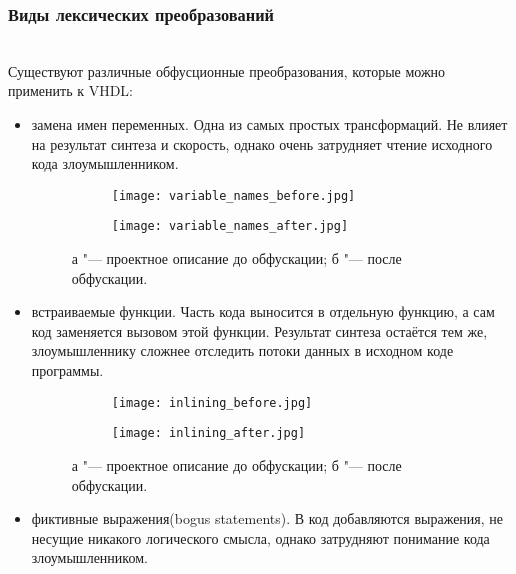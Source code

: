 \subsubsection{Виды лексических преобразований}~\\
Существуют различные обфусционные преобразования, которые можно применить к VHDL:
\begin{itemize}
\item замена имен переменных. Одна из самых простых трансформаций. Не влияет на результат синтеза и скорость, однако очень затрудняет чтение исходного кода злоумышленником.
\begin{figure}[ht]
\centering
  \begin{subfigure}[b]{0.45\textwidth}
    \centering
    \texttt{[image: variable\_names\_before.jpg]}
    \caption{}
  \end{subfigure}
  \begin{subfigure}[b]{0.45\textwidth}
    \centering
    \texttt{[image: variable\_names\_after.jpg]}
    \caption{}
  \end{subfigure}
  \caption{ а "--- проектное описание до обфускации;
            б "--- после обфускации.}
  \label{fig:fire_alarms}
\end{figure}

\item встраиваемые функции. Часть кода выносится в отдельную функцию, а сам код заменяется вызовом этой функции. Результат синтеза остаётся тем же, злоумышленнику сложнее отследить потоки данных в исходном коде программы.


\begin{figure}[ht]
\centering
  \begin{subfigure}[b]{0.45\textwidth}
    \centering
    \texttt{[image: inlining\_before.jpg]}
    \caption{}
  \end{subfigure}
  \begin{subfigure}[b]{0.45\textwidth}
    \centering
    \texttt{[image: inlining\_after.jpg]}
    \caption{}
  \end{subfigure}
  \caption{ а "--- проектное описание до обфускации;
            б "--- после обфускации.}
  \label{fig:fire_alarms}
\end{figure}

\item фиктивные выражения(bogus statements). В код добавляются выражения, не несущие никакого  логического смысла, однако затрудняют понимание кода злоумышленником.



\end{itemize}
